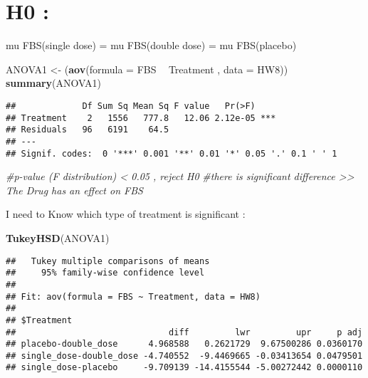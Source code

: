 \documentclass[]{article}
\newenvironment{Shaded}{\begin{snugshade}}{\end{snugshade}}
\newcommand{\KeywordTok}[1]{\textcolor[rgb]{0.13,0.29,0.53}{\textbf{#1}}}
\newcommand{\DataTypeTok}[1]{\textcolor[rgb]{0.13,0.29,0.53}{#1}}
\newcommand{\StringTok}[1]{\textcolor[rgb]{0.31,0.60,0.02}{#1}}
\newcommand{\CommentTok}[1]{\textcolor[rgb]{0.56,0.35,0.01}{\textit{#1}}}
\newcommand{\OperatorTok}[1]{\textcolor[rgb]{0.81,0.36,0.00}{\textbf{#1}}}
\newcommand{\NormalTok}[1]{#1}
\begin{document}
\section{H0 :}\label{h0}

mu FBS(single dose) = mu FBS(double dose) = mu FBS(placebo)

\begin{Shaded}
\begin{Highlighting}[]
\NormalTok{ANOVA1 <-}\StringTok{ }\NormalTok{(}\KeywordTok{aov}\NormalTok{(}\DataTypeTok{formula =}\NormalTok{ FBS }\OperatorTok{~}\StringTok{ }\NormalTok{Treatment , }\DataTypeTok{data =}\NormalTok{ HW8)) }
\KeywordTok{summary}\NormalTok{(ANOVA1)}
\end{Highlighting}
\end{Shaded}

\begin{verbatim}
##             Df Sum Sq Mean Sq F value   Pr(>F)    
## Treatment    2   1556   777.8   12.06 2.12e-05 ***
## Residuals   96   6191    64.5                     
## ---
## Signif. codes:  0 '***' 0.001 '**' 0.01 '*' 0.05 '.' 0.1 ' ' 1
\end{verbatim}

\begin{Shaded}
\begin{Highlighting}[]
\CommentTok{#p-value (F distribution)  < 0.05  , reject H0}
\CommentTok{#there is significant difference >> The Drug has an effect on FBS}
\end{Highlighting}
\end{Shaded}

I need to Know which type of treatment is significant :

\begin{Shaded}
\begin{Highlighting}[]
\KeywordTok{TukeyHSD}\NormalTok{(ANOVA1)}
\end{Highlighting}
\end{Shaded}

\begin{verbatim}
##   Tukey multiple comparisons of means
##     95% family-wise confidence level
## 
## Fit: aov(formula = FBS ~ Treatment, data = HW8)
## 
## $Treatment
##                              diff         lwr         upr     p adj
## placebo-double_dose      4.968588   0.2621729  9.67500286 0.0360170
## single_dose-double_dose -4.740552  -9.4469665 -0.03413654 0.0479501
## single_dose-placebo     -9.709139 -14.4155544 -5.00272442 0.0000110
\end{verbatim}
\end{document}
